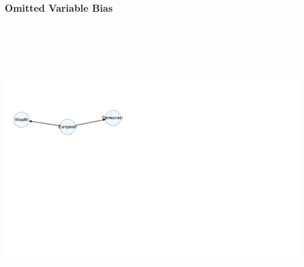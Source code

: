 \documentclass[xcolor=x11names,compress]{beamer}\usepackage[]{graphicx}\usepackage[]{color}
\newenvironment{knitrout}{}{} %
\renewcommand{\(}{\begin{columns}}
\renewcommand{\)}{\end{columns}}
\newcommand{\<}[1]{\begin{column}{#1}}
\renewcommand{\>}{\end{column}}
\begin{document}
\begin{frame}
\frametitle{Omitted Variable Bias}
\begin{knitrout}
\color{fgcolor}

{\centering \includegraphics[width=800,height=500]{figure/unnamed-chunk-2-1} 

}



\end{knitrout}
\end{frame}
\end{document}
